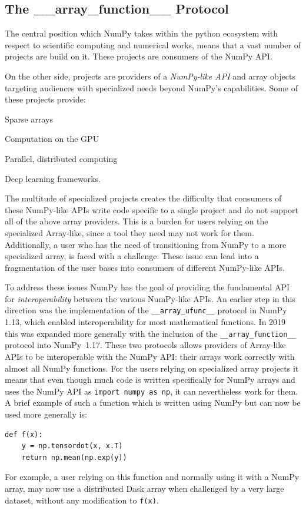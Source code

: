 \documentclass[fleqn,10pt]{wlscirep}
\newcommand{\code}[1]{\texttt{#1}}
\newcommand{\tightlist}{\setlength{\itemsep}{0pt}\setlength{\parskip}{0pt}}
\begin{document}
\subsection*{The \_\_array\_function\_\_ Protocol}

The central position which NumPy takes within the python ecosystem with
respect to scientific computing and numerical works,
means that a vast number of projects are build on it.
These projects are consumers of the NumPy API.

On the other side, projects are providers of a
\emph{NumPy-like API} and array objects targeting audiences with specialized needs beyond
NumPy's capabilities. Some of these projects provide:

\begin{description}
    \tightlist
    \item[SciPy's \code{scipy.sparse} and \code{pydata.sparse}:] Sparse arrays
    \item[CuPy:] Computation on the GPU
    \item[Dask:] Parallel, distributed computing
    \item[PyTorch and TensorFlow:] Deep learning frameworks.
\end{description}

The multitude of specialized projects creates the difficulty that consumers
of these NumPy-like APIs write code specific to a single project and do not support
all of the above array providers.
This is a burden for users relying on the specialized Array-like, since
a tool they need may not work for them.
Additionally, a user who has the need of transitioning from NumPy to a more
specialized array, is faced with a challenge.
These issue can lead into a fragmentation of the user bases into consumers
of different NumPy-like APIs.

To address these issues NumPy has the goal of providing the fundamental
API for \emph{interoperability} between the various NumPy-like APIs.
An earlier step in this direction was the implementation of the
\code{\_\_array\_ufunc\_\_} protocol in NumPy 1.13, which enabled interoperability
for most mathematical functions.\cite{NEP13}
In 2019 this was expanded more generally with the inclusion of the
\code{\_\_array\_function\_\_} protocol into NumPy~1.17.
These two protocols allows providers of Array-like APIs to be interoperable
with the NumPy API: their arrays work correctly with almost all NumPy functions.\cite{NEP18}
For the users relying on specialized array projects it means that even though
much code is written specifically for NumPy arrays and uses the NumPy API as
\code{import numpy as np}, it can nevertheless work for them.
A brief example of such a function which is written using NumPy
but can now be used more generally is:
\begin{lstlisting}
def f(x):
    y = np.tensordot(x, x.T)
    return np.mean(np.exp(y))
\end{lstlisting}
For example, a user relying on this function and normally using it with a
NumPy array, may now use a distributed Dask array when challenged
by a very large dataset, without any modification to \code{f(x)}.
\end{document}

